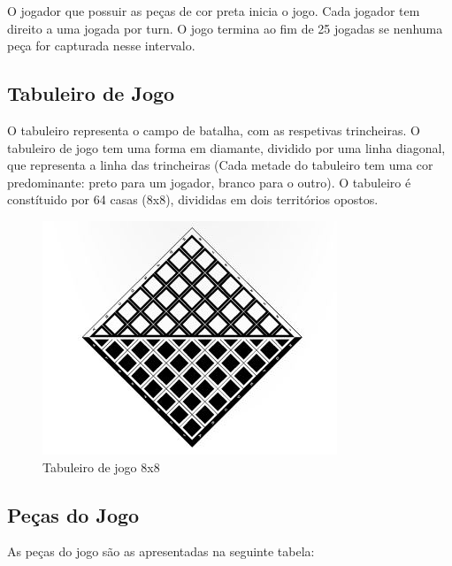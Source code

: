 \documentclass[a4paper]{article}
\begin{document}
O jogador que possuir as peças de cor preta inicia o jogo. Cada jogador tem direito a uma jogada por turn. O jogo termina ao fim de 25 jogadas se nenhuma peça for capturada nesse intervalo.

\newpage

\subsection{Tabuleiro de Jogo}

O tabuleiro representa o campo de batalha, com as respetivas trincheiras.
O tabuleiro de jogo tem uma forma em diamante, dividido por uma linha diagonal, que representa a linha das trincheiras (Cada metade do tabuleiro tem uma cor predominante: preto para um jogador, branco para o outro).
O tabuleiro é constítuido por 64 casas (8x8), divididas em dois territórios opostos.

\begin{figure}[h!]
\begin{center}
\includegraphics[scale=0.5]{img/board.jpg}
\caption{Tabuleiro de jogo 8x8}
\label{fig:1}
\end{center}
\end{figure}


\subsection{Peças do Jogo}

As peças do jogo são as apresentadas na seguinte tabela:
\end{document}
